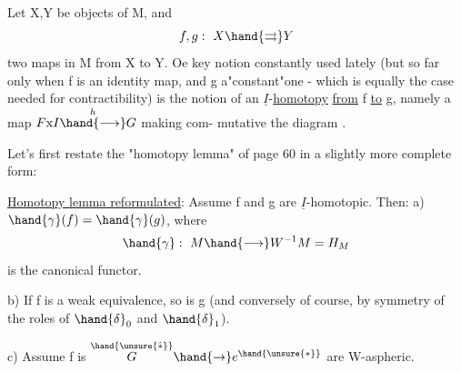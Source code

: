 Let X,Y be objects of M,  and 
\[ f,g:\ X\hand{\rightrightarrows} Y \]
two maps in M from X to Y. Oe key notion constantly used lately (but so
far only when f is an identity map,  and g a"constant"one  -  which is
equally the case needed for   contractibility) is the notion
of an $\underline{I}$-\uline{homotopy}  \uline{from} f \uline{to} g,  namely a map $F\mathrm{x}I\overset{h}{\hand{\longrightarrow}}G$  making com-%
mutative the diagram
 .

Let's first restate the "homotopy lemma" of page 60 in a slightly more
complete form:

\uline{Homotopy lemma reformulated}:  Assume f and g are $\underline{I}$-homotopic.  Then:
a) $\hand{\gamma}(f)=\hand{\gamma}(g)$,  where
\[ \hand{\gamma}:\ M\hand{\longrightarrow} W^{-1}M = H_{M} \]
is the canonical functor.

b) If  f  is a weak equivalence,  so is g  (and conversely of course,
by symmetry\xout{\illegible{}} of the roles of $\hand{\delta}_0$ and $\hand{\delta}_1$).

c) Assume f is  
$\overset{\hand{\unsure{\hat{\ast}}}}{G}\hand{\rightarrow} e^{\hand{\unsure{\ast}}}$  are W-aspheric.

